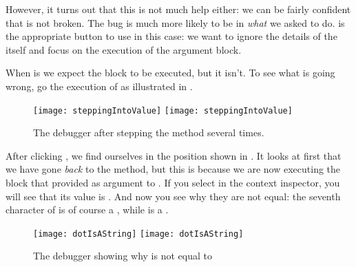 \documentclass[a4paper,10pt,twoside]{book}
\begin{document}
However, it turns out that this is not much help either: we can be fairly confident that  is not broken.  The bug is much more likely to be in \emph{what} we asked \pharo to do.
 is the appropriate button to use in this case: we want to ignore the details of the  itself and focus on the execution of the argument block. 


When  is  we expect the  block to be executed, but it isn't.
To see what is going wrong, go  the execution of  as illustrated in .

\begin{figure}[btp]
	\begin{center}
	\ifluluelse
		{\texttt{[image: steppingIntoValue]}}
		{\texttt{[image: steppingIntoValue]}}
	\end{center}
	\caption{The debugger after stepping  the  method several times.}
\end{figure}

After clicking , we find ourselves in the position shown in .
It looks at first that we have gone \emph{back} to the  method, but this is because we are now executing the block that  provided as argument to .
If you select  in the context inspector, you will see that its value is .
And now you see why they are not equal: the seventh character of  is of course a , while  is a .

\begin{figure}[btp]
	\begin{center}
	\ifluluelse
		{\texttt{[image: dotIsAString]}}
		{\texttt{[image: dotIsAString]}}
	\end{center}
	\caption{The debugger showing why  is not equal to }
\end{figure}
\end{document}
